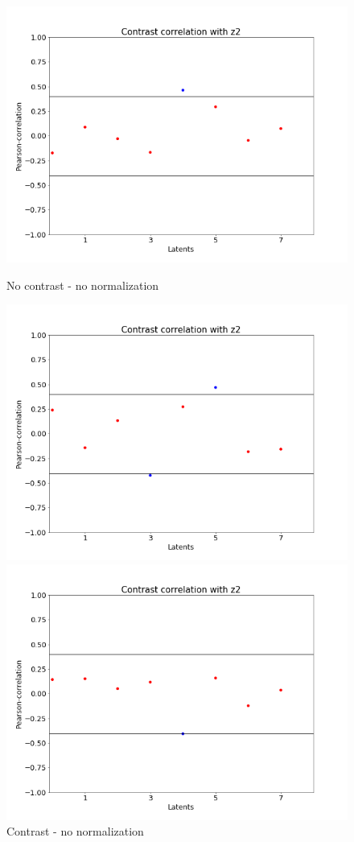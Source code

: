 \documentclass[12pt, english]{article}
\begin{document}
\begin{figure}[H] 
  \label{fig:contrast-correlation} 
  \begin{minipage}[b]{0.5\linewidth}
    \centering
    \includegraphics[width=.72\linewidth]{contrast_to_latent/no_norm_contrast_z2_corr.png} 
    \caption{No contrast - no normalization} 
    \label{fig:no-contrast-no-norm}
  \end{minipage}%
  \begin{minipage}[b]{0.5\linewidth}
    \centering
    \includegraphics[width=.72\linewidth]{contrast_to_latent/no_norm_contrast_contrast_z2_corr.png} 
    \caption{Contrast - no normalization} 
    \label{fig:contrast-no-norm}
  \end{minipage} 
  \begin{minipage}[b]{0.5\linewidth}
    \centering
    \includegraphics[width=.72\linewidth]{contrast_to_latent/norm_no_contrast_correlation.png} 

\end{minipage}
\end{figure}
\end{document}
